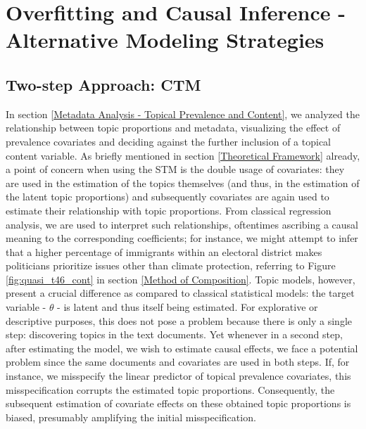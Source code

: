 \section{Overfitting and Causal Inference - Alternative Modeling Strategies}
\label{Overfitting and Causal Inference - Alternative Modeling Strategies}

\subsection{Two-step Approach: CTM}
\label{Two-step Approach: CTM}

In section \ref{Metadata Analysis - Topical Prevalence and Content}, we analyzed the relationship between topic proportions and metadata, visualizing the effect of prevalence covariates and deciding against the further inclusion of a topical content variable. As briefly mentioned in section \ref{Theoretical Framework} already, a point of concern when using the STM is the double usage of covariates: they are used in the estimation of the topics themselves (and thus, in the estimation of the latent topic proportions) and subsequently covariates are again used to estimate their relationship with topic proportions. From classical regression analysis, we are used to interpret such relationships, oftentimes ascribing a causal meaning to the corresponding coefficients; for instance, we might attempt to infer that a higher percentage of immigrants within an electoral district makes politicians prioritize issues other than climate protection, referring to Figure \ref{fig:quasi_t46_cont} in section \ref{Method of Composition}. Topic models, however, present a crucial difference as compared to classical statistical models: the target variable - $\theta$ - is latent and thus itself being estimated. For explorative or descriptive purposes, this does not pose a problem because there is only a single step: discovering topics in the text documents. Yet whenever in a second step, after estimating the model, we wish to estimate causal effects, we face a potential problem since the same documents and covariates are used in both steps. If, for instance, we misspecify the linear predictor of topical prevalence covariates, this misspecification corrupts the estimated topic proportions. Consequently, the subsequent estimation of covariate effects on these obtained topic proportions is biased, presumably amplifying the initial misspecification.

